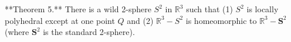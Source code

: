 **Theorem 5.** There is a wild 2-sphere $S^2$ in $\mathbb{R}^3$ such that (1) $S^2$ is locally polyhedral except at one point $Q$ and (2) $\mathbb{R}^3 - S^2$ is homeomorphic to $\mathbb{R}^3 - \mathbf{S}^2$ (where $\mathbf{S}^2$ is the standard 2-sphere).
